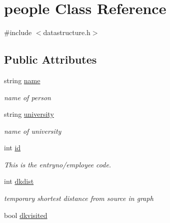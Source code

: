 \hypertarget{classpeople}{\section{people \-Class \-Reference}
\label{classpeople}
}


{\ttfamily \#include $<$datastructure.\-h$>$}

\subsection*{\-Public \-Attributes}
\begin{DoxyCompactItemize}
\item 
\hypertarget{classpeople_acd66673e55eeeca7b88da435c553c86e}{string \hyperlink{classpeople_acd66673e55eeeca7b88da435c553c86e}{name}}\label{classpeople_acd66673e55eeeca7b88da435c553c86e}

\begin{DoxyCompactList}\small\item\em name of person \end{DoxyCompactList}\item 
\hypertarget{classpeople_aee441c9efa0f84b5269889974d0fe4d7}{string \hyperlink{classpeople_aee441c9efa0f84b5269889974d0fe4d7}{university}}\label{classpeople_aee441c9efa0f84b5269889974d0fe4d7}

\begin{DoxyCompactList}\small\item\em name of university \end{DoxyCompactList}\item 
\hypertarget{classpeople_a525c43f7d6314f9af8ebe0f65f890643}{int \hyperlink{classpeople_a525c43f7d6314f9af8ebe0f65f890643}{id}}\label{classpeople_a525c43f7d6314f9af8ebe0f65f890643}

\begin{DoxyCompactList}\small\item\em \-This is the entryno/employee code. \end{DoxyCompactList}\item 
\hypertarget{classpeople_a4f657cde5b04f55227a6f8f7d51c1d3a}{int \hyperlink{classpeople_a4f657cde5b04f55227a6f8f7d51c1d3a}{dkdist}}\label{classpeople_a4f657cde5b04f55227a6f8f7d51c1d3a}

\begin{DoxyCompactList}\small\item\em temporary shortest distance from source in graph \end{DoxyCompactList}\item 
\hypertarget{classpeople_a53e9026bace3aec8010bca9a85fff9ba}{bool \hyperlink{classpeople_a53e9026bace3aec8010bca9a85fff9ba}{dkvisited}}\label{classpeople_a53e9026bace3aec8010bca9a85fff9ba}


\end{DoxyCompactItemize}
